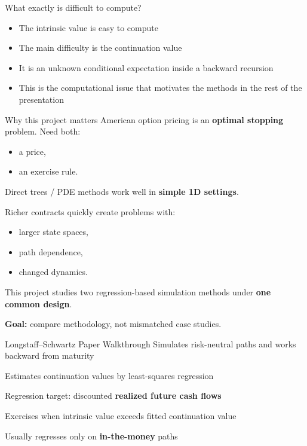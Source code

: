 \documentclass[
  11pt,
  ignorenonframetext,
  aspectratio=169,
]{beamer}
\providecommand{\tightlist}{%
  \setlength{\itemsep}{0pt}\setlength{\parskip}{0pt}}
\begin{document}
\begin{frame}{What exactly is difficult to compute?}
\label{what-exactly-is-difficult-to-compute}
\begin{itemize}
\item
  The intrinsic value is easy to compute
\item
  The main difficulty is the continuation value
\item
  It is an unknown conditional expectation inside a backward recursion
\item
  This is the computational issue that motivates the methods in the rest
  of the presentation
\end{itemize}
\end{frame}

\begin{frame}{Why this project matters}
\label{why-this-project-matters}
American option pricing is an \textbf{optimal stopping} problem. Need
both:

\begin{itemize}
\tightlist
\item
  a price,
\item
  an exercise rule.
\end{itemize}

Direct trees / PDE methods work well in \textbf{simple 1D settings}.

Richer contracts quickly create problems with:

\begin{itemize}
\tightlist
\item
  larger state spaces,
\item
  path dependence,
\item
  changed dynamics.
\end{itemize}

This project studies two regression-based simulation methods under
\textbf{one common design}.

\textbf{Goal:} compare methodology, not mismatched case studies.
\end{frame}

\begin{frame}{Longstaff--Schwartz Paper Walkthrough}
\label{longstaffschwartz-paper-walkthrough}
Simulates risk-neutral paths and works backward from maturity

Estimates continuation values by least-squares regression

Regression target: discounted \textbf{realized future cash flows}

Exercises when intrinsic value exceeds fitted continuation value

Usually regresses only on \textbf{in-the-money} paths
\end{frame}
\end{document}
